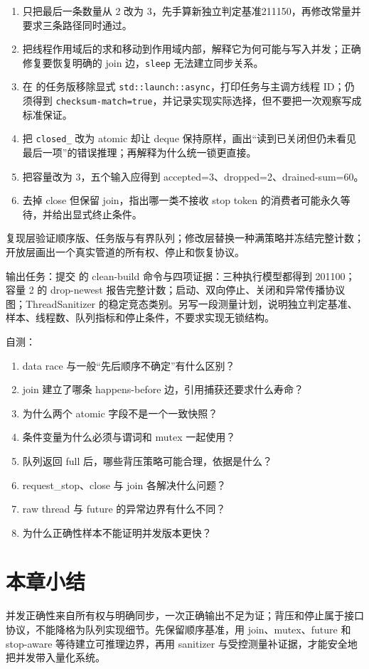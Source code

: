 \begin{enumerate}
  \item 只把最后一条数量从 2 改为 3，先手算新独立判定基准211150，再修改常量并要求三条路径同时通过。
  \item 把线程作用域后的求和移动到作用域内部，解释它为何可能与写入并发；正确修复要恢复明确的 join 边，\texttt{sleep} 无法建立同步关系。
  \item 在  的任务版移除显式 \texttt{std::launch::async}，打印任务与主调方线程 ID；仍须得到 \texttt{checksum-match=true}，并记录实现实际选择，但不要把一次观察写成标准保证。
  \item 把 \texttt{closed\_} 改为 atomic 却让 deque 保持原样，画出“读到已关闭但仍未看见最后一项”的错误推理；再解释为什么统一锁更直接。
  \item 把容量改为 3，五个输入应得到 accepted=3、dropped=2、drained-sum=60。
  \item 去掉 close 但保留 join，指出哪一类不接收 stop token 的消费者可能永久等待，并给出显式终止条件。
\end{enumerate}

复现层验证顺序版、任务版与有界队列；修改层替换一种满策略并冻结完整计数；开放层画出一个真实管道的所有权、停止和恢复协议。

输出任务：提交  的 clean-build 命令与四项证据：三种执行模型都得到 201100；容量 2 的 drop-newest 报告完整计数；启动、双向停止、关闭和异常传播协议图；ThreadSanitizer 的稳定竞态类别。另写一段测量计划，说明独立判定基准、样本、线程数、队列指标和停止条件，不要求实现无锁结构。

自测：
\begin{enumerate}
  \item data race 与一般“先后顺序不确定”有什么区别？
  \item join 建立了哪条 happens-before 边，引用捕获还要求什么寿命？
  \item 为什么两个 atomic 字段不是一个一致快照？
  \item 条件变量为什么必须与谓词和 mutex 一起使用？
  \item 队列返回 full 后，哪些背压策略可能合理，依据是什么？
  \item request\_stop、close 与 join 各解决什么问题？
  \item raw thread 与 future 的异常边界有什么不同？
  \item 为什么正确性样本不能证明并发版本更快？
\end{enumerate}


\section{本章小结}

并发正确性来自所有权与明确同步，一次正确输出不足为证；背压和停止属于接口协议，不能降格为队列实现细节。先保留顺序基准，用 join、mutex、future 和 stop-aware 等待建立可推理边界，再用 sanitizer 与受控测量补证据，才能安全地把并发带入量化系统。
